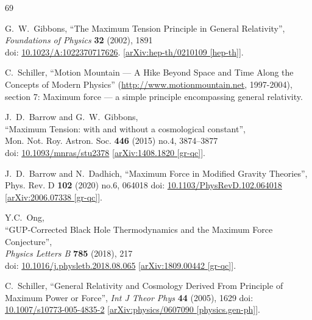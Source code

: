 \documentclass[12pt]{article}
\begin{document}
\begin{thebibliography}{69}

G.~W.~Gibbons,
``The Maximum Tension Principle in General Relativity'',\\
\textit{Foundations of Physics} \textbf{32} (2002), 1891\\
doi: \href{https://doi.org/10.1023/A:1022370717626}{10.1023/A:1022370717626}. 
[\href{https://www.arxiv.org/abs/hep-th/0210109}{arXiv:hep-th/0210109 [hep-th]}].

C.~Schiller,
``Motion Mountain --- A Hike Beyond Space and Time Along the Concepts of Modern Physics'' (\url{http://www.motionmountain.net}, 1997-2004), \\
section 7: Maximum force --- a simple principle encompassing general relativity.

J.~D.~Barrow and G.~W.~Gibbons,\\
``Maximum Tension: with and without a cosmological constant'',\\
Mon. Not. Roy. Astron. Soc. \textbf{446} (2015) no.4, 3874--3877\\
doi: \href{https://doi.org/10.1093/mnras/stu2378}{10.1093/mnras/stu2378}
[\href{https://www.arxiv.org/abs/1408.1820}{arXiv:1408.1820 [gr-qc]}].

J.~D.~Barrow and N.~Dadhich,
``Maximum Force in Modified Gravity Theories'',\\
Phys. Rev. D \textbf{102} (2020) no.6, 064018
doi: \href{https://doi.org/10.1103/PhysRevD.102.064018}{10.1103/PhysRevD.102.064018}
[\href{https://www.arxiv.org/abs/2006.07338}{arXiv:2006.07338 [gr-qc]}].

Y.C.~Ong,\\
``GUP-Corrected Black Hole Thermodynamics and the Maximum Force Conjecture'',\\
\textit{Physics Letters B} \textbf{785} (2018), 217\\
doi: \href{https://doi.org/10.1016/j.physletb.2018.08.065}{10.1016/j.physletb.2018.08.065}
[\href{https://www.arxiv.org/abs/1809.00442}{arXiv:1809.00442 [gr-qc]}].

C.~Schiller,
``General Relativity and Cosmology Derived From Principle of Maximum Power or Force'',
\textit{Int J Theor Phys} \textbf{44} (2005), 1629
doi:  \href{https://doi.org/10.1007/s10773-005-4835-2}{10.1007/s10773-005-4835-2}
[\href{https://www.arxiv.org/abs/physics/0607090}{arXiv:physics/0607090 [physics.gen-ph]}].


\end{thebibliography}
\end{document}
